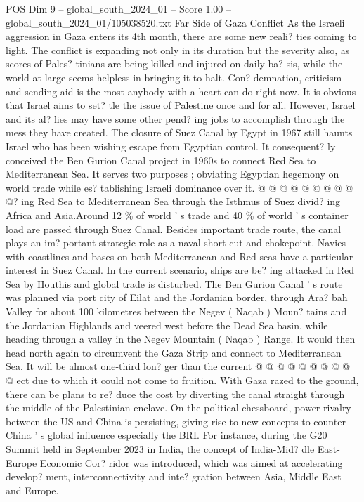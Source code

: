 \begin{textsample}{POS Dim 9 – global\_south\_2024\_01 – Score 1.00 – global\_south\_2024\_01/105038520.txt}  \label{ex:f9_pos_068}
Far Side of Gaza Conflict As the Israeli aggression in Gaza enters its 4th month, there are some new reali? ties coming to light.
The conflict is expanding not only in its duration but the severity also, as scores of Pales? tinians are being killed and injured on daily ba? sis, while the world at large seems helpless in bringing it to halt.
Con? demnation, criticism and sending aid is the most anybody with a heart can do right now.
It is obvious that Israel aims to set? tle the issue of Palestine once and for all.
However, Israel and its al? lies may have some other pend? ing jobs to accomplish through the mess they have created.
The closure of Suez Canal by Egypt in 1967 still haunts Israel who has been wishing escape from Egyptian control.
It consequent? ly conceived the Ben Gurion Canal project in 1960s to connect Red Sea to Mediterranean Sea.
It serves two purposes ; obviating Egyptian hegemony on world trade while es? tablishing Israeli dominance over it. @ @ @ @ @ @ @ @ @ @? ing Red Sea to Mediterranean Sea through the Isthmus of Suez divid? ing Africa and Asia.Around 12 \% of world ' s trade and 40 \% of world ' s container load are passed through Suez Canal.
Besides important trade route, the canal plays an im? portant strategic role as a naval short-cut and chokepoint.
Navies with coastlines and bases on both Mediterranean and Red seas have a particular interest in Suez Canal.
In the current scenario, ships are be? ing attacked in Red Sea by Houthis and global trade is disturbed.
The Ben Gurion Canal ' s route was planned via port city of Eilat and the Jordanian border, through Ara? bah Valley for about 100 kilometres between the Negev ( Naqab ) Moun? tains and the Jordanian Highlands and veered west before the Dead Sea basin, while heading through a valley in the Negev Mountain ( Naqab ) Range.
It would then head north again to circumvent the Gaza Strip and connect to Mediterranean Sea.
It will be almost one-third lon? ger than the current @ @ @ @ @ @ @ @ @ @ ect due to which it could not come to fruition.
With Gaza razed to the ground, there can be plans to re? duce the cost by diverting the canal straight through the middle of the Palestinian enclave.
On the political chessboard, power rivalry between the US and China is persisting, giving rise to new concepts to counter China ' s global influence especially the BRI.
For instance, during the G20 Summit held in September 2023 in India, the concept of India-Mid? dle East-Europe Economic Cor? ridor was introduced, which was aimed at accelerating develop? ment, interconnectivity and inte? gration between Asia, Middle East and Europe.

\end{textsample}
